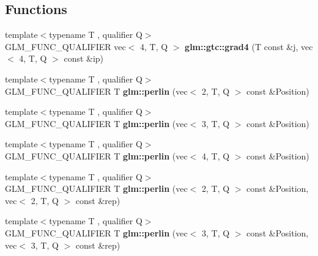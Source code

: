 \subsection*{Functions}
\begin{DoxyCompactItemize}
\item 
\mbox{\label{noise_8inl_a3e64854dc3369fadffdc335c55a90fd5}} 
{\footnotesize template$<$typename T , qualifier Q$>$ }\\G\+L\+M\+\_\+\+F\+U\+N\+C\+\_\+\+Q\+U\+A\+L\+I\+F\+I\+ER vec$<$ 4, T, Q $>$ {\bfseries glm\+::gtc\+::grad4} (T const \&j, vec$<$ 4, T, Q $>$ const \&ip)
\item 
\mbox{\label{noise_8inl_a54326f7a6c7c00d7702fe6f15fa0d13f}} 
{\footnotesize template$<$typename T , qualifier Q$>$ }\\G\+L\+M\+\_\+\+F\+U\+N\+C\+\_\+\+Q\+U\+A\+L\+I\+F\+I\+ER T {\bfseries glm\+::perlin} (vec$<$ 2, T, Q $>$ const \&Position)
\item 
\mbox{\label{noise_8inl_add5d8345389c307da58e6916d949c4be}} 
{\footnotesize template$<$typename T , qualifier Q$>$ }\\G\+L\+M\+\_\+\+F\+U\+N\+C\+\_\+\+Q\+U\+A\+L\+I\+F\+I\+ER T {\bfseries glm\+::perlin} (vec$<$ 3, T, Q $>$ const \&Position)
\item 
\mbox{\label{noise_8inl_ad9c74f290ab9071e4b3d158d62c7efdf}} 
{\footnotesize template$<$typename T , qualifier Q$>$ }\\G\+L\+M\+\_\+\+F\+U\+N\+C\+\_\+\+Q\+U\+A\+L\+I\+F\+I\+ER T {\bfseries glm\+::perlin} (vec$<$ 4, T, Q $>$ const \&Position)
\item 
\mbox{\label{noise_8inl_aa9d7537f6a631bed7dc89a866590c2b8}} 
{\footnotesize template$<$typename T , qualifier Q$>$ }\\G\+L\+M\+\_\+\+F\+U\+N\+C\+\_\+\+Q\+U\+A\+L\+I\+F\+I\+ER T {\bfseries glm\+::perlin} (vec$<$ 2, T, Q $>$ const \&Position, vec$<$ 2, T, Q $>$ const \&rep)
\item 
\mbox{\label{noise_8inl_aea1a673faff023ed76c5b8a54ee6b1c0}} 
{\footnotesize template$<$typename T , qualifier Q$>$ }\\G\+L\+M\+\_\+\+F\+U\+N\+C\+\_\+\+Q\+U\+A\+L\+I\+F\+I\+ER T {\bfseries glm\+::perlin} (vec$<$ 3, T, Q $>$ const \&Position, vec$<$ 3, T, Q $>$ const \&rep)

\end{DoxyCompactItemize}
